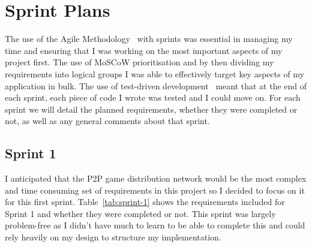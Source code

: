 \section{Sprint Plans}\label{sec:sprints}

The use of the Agile Methodology~\cite{ilieva_analyses_2004} with sprints was essential in managing my time and ensuring that I was working on the most important aspects of my project first. The use of MoSCoW prioritisation and by then dividing my requirements into logical groups I was able to effectively target key aspects of my application in bulk. The use of test-driven development~\cite{beck_test-driven_2003} meant that at the end of each sprint, each piece of code I wrote was tested and I could move on.
\x
For each sprint we will detail the planned requirements, whether they were completed or not, as well as any general comments about that sprint.

\subsection*{Sprint 1}

I anticipated that the P2P game distribution network would be the most complex and time consuming set of requirements in this project so I decided to focus on it for this first sprint. Table~\ref{tab:sprint-1} shows the requirements included for Sprint 1 and whether they were completed or not.
\x
This sprint was largely problem-free as I didn't have much to learn to be able to complete this and could rely heavily on my design to structure my implementation.

